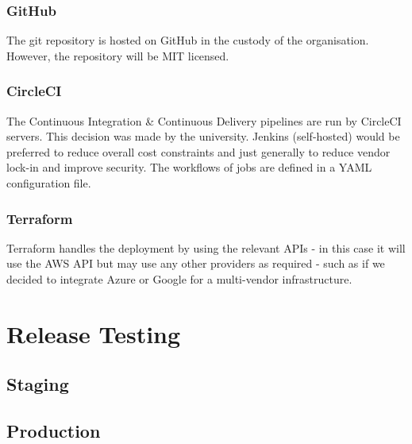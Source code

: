 \documentclass[10pt]{article}
\begin{document}
\subsubsection{GitHub}
The git repository is hosted on GitHub in the custody of the organisation. However, the repository will be MIT licensed.
\subsubsection{CircleCI}
The Continuous Integration \& Continuous Delivery pipelines are run by CircleCI servers. This decision was made by the university. Jenkins (self-hosted) would be preferred to reduce overall cost constraints and just generally to reduce vendor lock-in and improve security. The workflows of jobs are defined in a YAML configuration file. 
\subsubsection{Terraform}
Terraform handles the deployment by using the relevant APIs - in this case it will use the AWS API but may use any other providers as required - such as if we decided to integrate Azure or Google for a multi-vendor infrastructure.


\section{Release Testing}
\subsection{Staging}
\subsection{Production}


\newpage
\printbibliography
\end{document}
